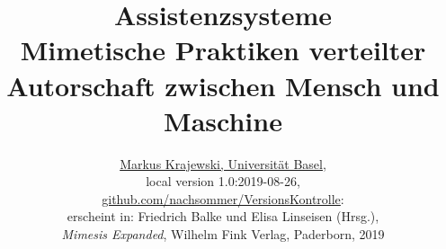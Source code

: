 \documentclass[a4paper,10pt]{article}
\date{}
\begin{document}
%
% 
\title{Assistenzsysteme\\
\normalsize Mimetische Praktiken verteilter\\ 
Autorschaft zwischen Mensch und Maschine}
\author{\href{http://gtm.mewi.unibas.ch}{Markus Krajewski, Universität Basel},\\[3mm]
local version 1.0:2019-08-26,\\
\href{https://github.com/nachsommer/VersionsKontrolle/tree/master/3.Fassung}{github.com/nachsommer/VersionsKontrolle}: \gitVer{}\\[3mm]
erscheint in: Friedrich Balke und Elisa Linseisen (Hrsg.),\\
\emph{Mimesis Expanded}, Wilhelm Fink Verlag, Paderborn, 2019}
\maketitle
\tableofcontents
\newpage
%
\begin{comment}

Am Ende, nachdem die drei commits eingestellt sind, das gesamte Repositorium auf github mit einer DOI versehen, und zwar über Zenodo:

https://guides.github.com/activities/citable-code/

\end{comment}
\end{document}

